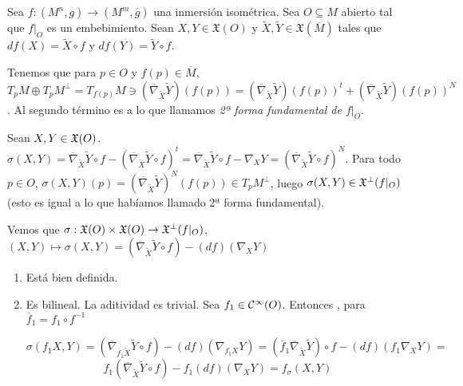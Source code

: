 \documentclass[GSR.tex]{subfiles}
\begin{document}
Sea $f:(M^n,g)\to (M^m,\overline{g})$ una inmersión isométrica. Sea $O\subseteq M$ abierto tal que $f|_O$ es un embebimiento. Sean $X,Y\in\mathfrak{X}(O)$ y $\widetilde{X},\widetilde{Y}\in\mathfrak{X}(\overline{M})$ tales que $df(X)=\widetilde{X}\circ f$ y $df(Y)=\widetilde{Y}\circ f$.

Tenemos que para $p\in O$ y $f(p)\in\overline{M}$, $T_pM\oplus T_pM^\perp =T_{f(p)}M\ni (\overline{\nabla}_{\widetilde{X}}\widetilde{Y})(f(p))=(\overline{\nabla}_{\widetilde{X}}\widetilde{Y})(f(p))^t+(\overline{\nabla}_{\widetilde{X}}\widetilde{Y})(f(p))^N$. Al segundo término es a lo que llamamos \emph{2ª forma fundamental de $f|_O$}.

\begin{defi}
Sean $X,Y\in{\mathfrak{X}}(O)$. $\sigma(X,Y)=\overline{\nabla}_{\widetilde{X}}\widetilde{Y}\circ f-(\overline{\nabla}_{\widetilde{X}}\widetilde{Y}\circ f)^t=\overline{\nabla}_{\widetilde{X}}\widetilde{Y}\circ f-\nabla_XY=(\overline{\nabla}_{\widetilde{X}}\widetilde{Y}\circ f)^N$. Para todo $p\in O$, $\sigma(X,Y)(p)=(\overline{\nabla}_{\widetilde{X}}\widetilde{Y})^N(f(p))\in T_pM^\perp$, luego $\sigma(X,Y)\in{\mathfrak{X}}^\perp(f|_O)$ (esto es igual a lo que habíamos llamado 2ª forma fundamental). 

Vemos que $\sigma:{\mathfrak{X}}(O)\times{\mathfrak{X}}(O)\to{\mathfrak{X}}^\perp(f|_O)$, $(X,Y)\mapsto\sigma(X,Y)=(\overline{\nabla}_{\widetilde{X}}\widetilde{Y}\circ f)-(df)(\nabla_X Y)$ 
\begin{enumerate}
\item Está bien definida.
\item Es bilineal. La aditividad es trivial. Sea $f_1\in\mathcal{C}^{\infty}(O)$. Entonces , para $\overline{f}_1=f_1\circ f^{-1}$

$$
\sigma(f_1X,Y)=(\overline{\nabla}_{\overline{f}_1\widetilde{X}}\widetilde{Y}\circ f)-(df)(\nabla_{f_1X}Y)=(\overline{f}_1\overline{\nabla}_{\widetilde{X}}\widetilde{Y})\circ f-(df)(f_1\nabla_XY)=
$$
$$f_1(\overline{\nabla}_{\widetilde{X}}\widetilde{Y}\circ f)-f_1(df)(\nabla_XY)=f_\sigma(X,Y)$$


\end{enumerate}
\end{defi}
\end{document}
